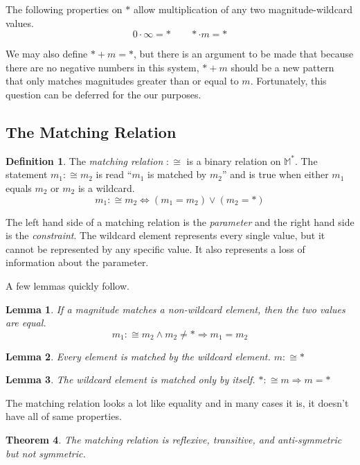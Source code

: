 \documentclass[twoside]{article}
\newcommand{\quotes}[1]{``#1''}
\theoremstyle{plain}%
\newtheorem{theorem}{Theorem}[section]
\newtheorem{lemma}[theorem]{Lemma}
\theoremstyle{definition}
\newtheorem{definition}{Definition}[section]
\theoremstyle{remark}
\begin{document}
The following properties on \(\ast\) allow multiplication of any two magnitude-wildcard values.
\[0 \cdot \infty = \ast \qquad \ast \cdot m = \ast\]

We may also define \(\ast + m = \ast\), but there is an argument to  be made that because there are no negative numbers in this system, \(\ast + m\) should be a new pattern that only matches magnitudes greater than or equal to \(m\). Fortunately, this question can be deferred for the our purposes.

\subsection{The Matching Relation}

\begin{definition}
The \textit{matching relation} \(:\cong\) is a binary relation on \(\mathbb{M}^*\). The statement \(m_1 :\cong m_2\) is read \quotes{\(m_1\) is matched by \(m_2\)} and is true when either \(m_1\) equals \(m_2\) or \(m_2\) is a wildcard.
\[m_1 :\cong m_2 \Longleftrightarrow (m_1 = m_2) \vee (m_2 = \ast)\]
\end{definition}

The left hand side of a matching relation is the \textit{parameter} and the right hand side is the \textit{constraint}. The wildcard element represents every single value, but it cannot be represented by any specific value. It also represents a loss of information about the parameter.

A few lemmas quickly follow.

\begin{lemma}
\label{wild_prop_1} If a magnitude matches a non-wildcard element, then the two values are equal. \[m_1 :\cong m_2 \wedge m_2 \neq \ast \Longrightarrow m_1 = m_2\]
\end{lemma}

\begin{lemma}
\label{wild_prop_2}
Every element is matched by the wildcard element. \(m :\cong \ast\)
\end{lemma}

\begin{lemma}
\label{wild_prop_3}
The wildcard element is matched only by itself. \(\ast :\cong m \Longrightarrow m = \ast\)
\end{lemma}

The matching relation looks a lot like equality and in many cases it is, it doesn't have all of same properties.

\begin{theorem}
The matching relation is reflexive, transitive, and anti-symmetric but not symmetric.
\end{theorem}
\end{document}
